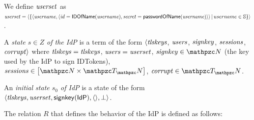  We define $\mathit{userset}$ as $\mathit{userset} = \langle\{\langle\mathit{username}, \langle {{}\mathit{id}=\mathsf{IDOfName}(\mathit{username}), \mathit{secret}=\mathsf{passwordOfName}(\mathit{username})} \rangle\rangle\, |\, username \in \mathbb{S}\}\rangle$.
  
  \begin{definition}\label{def:initial-state-idp}
    A \emph{state $s\in Z$ of the IdP} is a term of the form
    $\langle\mathit{tlskeys}$, $\mathit{users}$, $\mathit{signkey}$,
    $\mathit{sessions}$, $\mathit{corrupt}\rangle$ where 
    $\mathit{tlskeys} = \mathit{tlskeys} $, 
    $\mathit{users} = \mathit{userset}$, 
    $\mi{signkey} \in \nonces$ 
    (the key used by the IdP to sign IDTokens),
    $\mi{sessions}\in\dict{\nonces}{\terms}$, $\mi{corrupt} \in \terms$.
  
    An \emph{initial state $s_0$ of IdP} is a state of the form 
    $\langle\mathit{tlskeys}, \mathit{userset}, \mathsf{signkey}(\mathsf{IdP}), \langle\rangle, \bot\rangle$.
  \end{definition}
  
  The relation $R$ that defines the behavior of the IdP is defined as follows:
  

